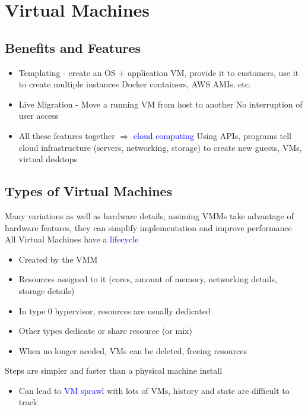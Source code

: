 \documentclass[oneside]{book}
\begin{document}
    \chapter{Virtual Machines}
        \section{Benefits and Features}
            \begin{itemize}
                \item Templating - create an OS + application VM, provide it to customers, use it to create multiple instances
                    \subitem Docker containers, AWS AMIs, etc.
                \item Live Migration - Move a running VM from host to another
                    \subitem No interruption of user access
                \item All these features together $\Longrightarrow$ \textcolor{blue}{cloud computing}
                    \subitem Using APIs, programs tell cloud infrastructure (servers, networking, storage) to create new guests, VMs, virtual desktops
            \end{itemize}
        \section{Types of Virtual Machines}
            Many variations as well as hardware details, assiming VMMs take advantage of hardware features, they can simplify implementation and improve performance
            All Virtual Machines have a \textcolor{blue}{lifecycle}
            \begin{itemize}
                \item Created by the VMM
                \item Resources assigned to it (cores, amount of memory, networking details, storage details)
                \item In type 0 hypervisor, resources are usually dedicated
                \item Other types dedicate or share resource (or mix)
                \item When no longer needed, VMs can be deleted, freeing resources
            \end{itemize}
            Steps are simpler and faster than a physical machine install
            \begin{itemize}
                \item Can lead to \textcolor{blue}{VM sprawl} with lots of VMs, history and state are difficult to track
            \end{itemize}
\end{document}
